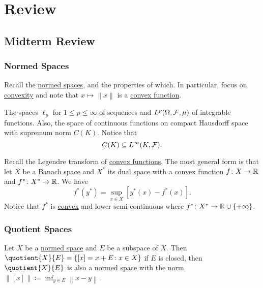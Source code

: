 \chapter{Review}
\section{Midterm Review}\label{sec:mid-review}
\subsection{Normed Spaces}
Recall the \hyperref[def:normed-vector-space]{normed spaces}, and the properties of which. In particular, focus on \hyperref[def:convex-function]{convexity} and note that \(x\mapsto \left\lVert x\right\rVert \) is a \hyperref[def:convex-function]{convex function}.

\begin{eg}
	The spaces \(\ell _p\) for \(1 \leq p \leq \infty \) of sequences and \(L^p(\Omega , \mathcal{\MakeUppercase{f}} , \mu )\) of integrable functions. Also, the space of continuous functions on compact Hausdorff space with supremum norm \(C(K)\). Notice that
	\[
		C(K) \subseteq L^{\infty} (K, \mathcal{\MakeUppercase{f}}).
	\]
\end{eg}

\begin{remark}
	Recall the Legendre transform of \hyperref[def:convex-function]{convex functions}. The most general form is that let \(X\) be a \hyperref[def:Banach-space]{Banach space} and \(X^{\ast} \) its \hyperref[def:dual-space]{dual space} with a \hyperref[def:convex-function]{convex function} \(f\colon X\to \mathbb{\MakeUppercase{r}} \) and \(f^{\ast} \colon X^{\ast} \to \mathbb{\MakeUppercase{r}} \). We have
	\[
		f^{\ast} (y^{\ast} ) = \sup _{x\in X}\left[ y^{\ast} (x) - f^{\ast} (x) \right].
	\]
	Notice that \(f^{\ast} \) is \hyperref[def:convex-function]{convex} and lower semi-continuous where \(f^{\ast} \colon X^{\ast} \to \mathbb{\MakeUppercase{r}} \cup \left\{ +\infty  \right\} \).
\end{remark}

\subsection{Quotient Spaces}
Let \(X\) be a \hyperref[def:normed-vector-space]{normed space} and \(E\) be a subspace of \(X\). Then \(\quotient{X}{E} = \left\{ [x] = x+E\colon x\in X \right\}  \) if \(E\) is closed, then \(\quotient{X}{E} \) is also a \hyperref[def:normed-vector-space]{normed space} with the \hyperref[def:norm]{norm} \(\left\lVert [x]\right\rVert \coloneqq \inf _{y\in E}\left\lVert x- y\right\rVert\).

